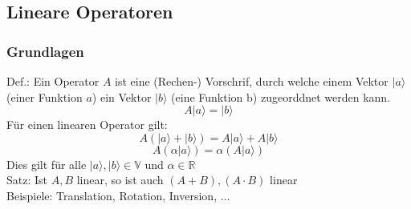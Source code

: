 \documentclass{article}
\begin{document}
\subsection{Lineare Operatoren}
\subsubsection{Grundlagen}
Def.: Ein Operator $A$ ist eine (Rechen-) Vorschrif, durch welche einem Vektor $|a\rangle $ (einer Funktion $a$) ein Vektor $|b\rangle $ (eine Funktion b) zugeorddnet werden kann.
\begin{equation*}
    A|a\rangle  = |b\rangle 
\end{equation*}
Für einen linearen Operator gilt:
\begin{equation*}
    A\left(|a\rangle  + |b\rangle \right)=A|a\rangle + A|b\rangle 
\end{equation*}
\begin{equation*}
    A\left(\alpha|a\rangle \right) = \alpha \left(A|a\rangle \right)
\end{equation*}
Dies gilt für alle $|a\rangle , |b\rangle  \in \mathbb{V}$ und $\alpha \in \mathbb{R}$\\
Satz: Ist $A, B$ linear, so ist auch $(A+B), (A\cdot B)$ linear\\
Beispiele: Translation, Rotation, Inversion, $\dots$
\end{document}
